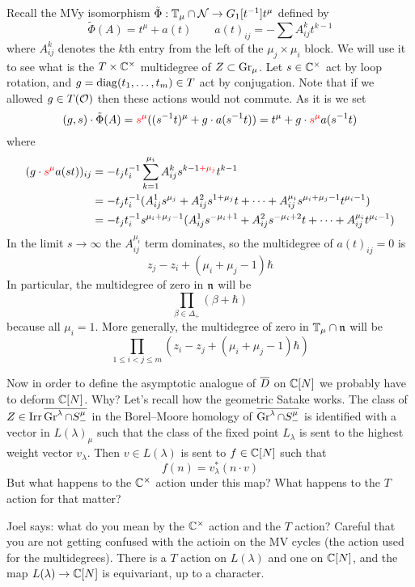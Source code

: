 \documentclass[11pt]{article}
\begin{document}
Recall the MVy isomorphism $\tilde\Phi : \mathbb T_\mu\cap\mathcal N \to G_1[t^{-1}]t^\mu$ defined by
\begin{equation}
    \tilde\Phi(A) = t^\mu + a(t) \qquad a(t)_{ij} = -\sum A_{ij}^k t^{k-1}
\end{equation}
where $A_{ij}^k$ denotes the $k$th entry from the left of the $\mu_j\times\mu_i$ block. We will use it to see what is the $T\times\mathbb C^\times$ multidegree of $Z\subset\operatorname{Gr}_\mu$. Let $s\in\mathbb C^\times$ act by loop rotation, and $g = \operatorname{diag}(t_1,\dots,t_m)\in T$ act by conjugation. Note that if we allowed $g\in T(\mathcal O)$ then these actions would not commute. As it is we set  
$$
(g,s) \cdot \tilde\Phi(A) = {\color{red} s^{\mu}}((s^{-1}t)^\mu + g\cdot a(s^{-1}t)) = t^\mu + g\cdot {\color{red} s^{\mu}} a(s^{-1}t) 
$$
where 
$$
\begin{aligned}
(g\cdot {\color{red} s^{\mu}}a(st))_{ij} &= - t_jt_i^{-1}\sum_{k=1}^{\mu_i} A_{ij}^k s^{k-1{\color{red}+\mu_j}}t^{k-1} \\
&= -t_jt_i^{-1}(A_{ij}^1 s^{\mu_j} + A_{ij}^2 s^{1 + \mu_j}t + \cdots + A_{ij}^{\mu_i}s^{\mu_i + \mu_j - 1}t^{\mu_i - 1}) \\
&= -t_jt_i^{-1}s^{\mu_i + \mu_j - 1}(A_{ij}^1 s^{-\mu_i + 1} + A_{ij}^2 s^{-\mu_i + 2}t + \cdots + A_{ij}^{\mu_i}t^{\mu_i - 1})
\end{aligned}
$$
In the limit $s\to \infty$ the $A_{ij}^{\mu_i}$ term dominates, so the multidegree of $a(t)_{ij}=0$ is 
$$z_j - z_i + (\mu_i + \mu_j - 1)\hbar$$
In particular, the multidegree of zero in $\mathfrak n$ will be 
$$
\prod_{\beta\in\Delta_+} (\beta + \hbar)
$$
because all $\mu_i = 1$. More generally, the multidegree of zero in $\mathbb T_\mu\cap\mathfrak n$ will be 
$$
\prod_{1\le i<j\le m} (z_i - z_j + (\mu_i + \mu_j - 1)\hbar)
$$

Now in order to define the asymptotic analogue of $\overline{D}$ on $\mathbb C[N]$ we probably have to deform $\mathbb C[N]$. Why? Let's recall how the geometric Satake works. The class of $Z\in\operatorname{Irr}\overline{\operatorname{Gr}^\lambda\cap S^\mu_-}$ in the Borel--Moore homology of $\overline{\operatorname{Gr}^\lambda\cap S^\mu_-}$ is identified with a vector in $L(\lambda)_\mu$ such that the class of the fixed point $L_\lambda$ is sent to the highest weight vector $v_\lambda$. Then $v\in L(\lambda)$ is sent to $f\in\mathbb C[N]$ such that 
$$
f(n) = v_\lambda^\ast(n\cdot v)
$$
But what happens to the $\mathbb C^\times$ action under this map? What happens to the $T$ action for that matter? 


{\color{red} Joel says:} what do you mean by the $ \mathbb C^\times$ action and the $ T$ action?  Careful that you are not getting confused with the actioin on the MV cycles (the action used for the multidegrees).  There is a $ T $ action on $L(\lambda)$ and one on $ \mathbb C[N]$, and the map $ L(\lambda) \rightarrow \mathbb C[N]$ is equivariant, up to a character.
\end{document}
